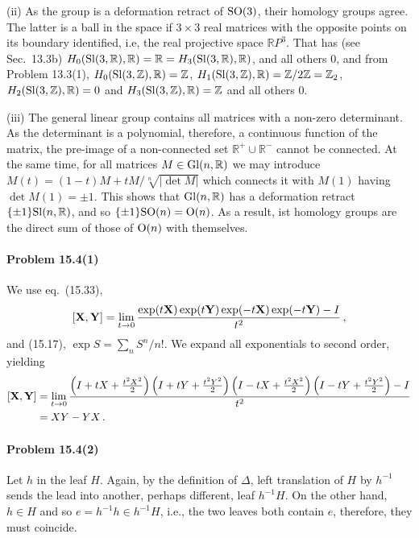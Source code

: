 \documentclass[a4paper,12pt]{article}
\newcommand{\problem}[1]{\paragraph{Problem #1}}
\begin{document}
(ii) As the group is a deformation retract of ${\rm SO}(3)$, their homology groups agree. The latter is a ball in the space if $3\times 3$ real matrices with the opposite points on its boundary identified, i.e, the real projective space $\mathbb{R}P^3$. That has (see Sec.\ 13.3b) $H_0({\rm Sl}(3, \mathbb{R}), \mathbb{R})=\mathbb{R} = H_3({\rm Sl}(3, \mathbb{R}), \mathbb{R})$, and all others 0, and from Problem 13.3(1),  $H_0({\rm Sl}(3, \mathbb{Z}), \mathbb{R})=\mathbb{Z}$, $H_1({\rm Sl}(3, \mathbb{Z}), \mathbb{R})=\mathbb{Z}/2\mathbb{Z}=\mathbb{Z}_2$, $H_2({\rm Sl}(3, \mathbb{Z}), \mathbb{R})=0$ and $H_3({\rm Sl}(3, \mathbb{Z}), \mathbb{R})=\mathbb{Z}$ and all others 0.

(iii) The general linear group contains all matrices with a non-zero determinant. As the determinant is a polynomial, therefore, a continuous function of the matrix, the pre-image of a non-connected set $\mathbb{R}^+ \cup \mathbb{R}^-$ cannot be connected.  At the same time, for all matrices $M\in {\rm Gl}(n, \mathbb{R})$ we may introduce $M(t) = (1-t) M + t M/\sqrt[n]{|\det M|}$ which connects it with $M(1)$ having $\det M(1) = \pm 1$. %
This shows that ${\rm Gl}(n, \mathbb{R})$ has a deformation retract $\{\pm 1\}{\rm Sl}(n, \mathbb{R})$, and so $\{\pm 1\}{\rm SO}(n) = {\rm O}(n)$. As a result, ist homology groups are the direct sum of those of ${\rm O}(n)$ with themselves.


\problem{15.4(1)} We use eq.\ (15.33),
\[
 [{\bf X}, {\bf Y}] = \lim_{t\to 0}\frac{\exp(t{\bf X})\exp(t{\bf Y})\exp(-t{\bf X})\exp(-t{\bf Y})-I}{t^2}\,,
\]
and (15.17), $\exp S = \sum_n S^n/{n!}$. We expand all exponentials to second order, yielding
\[
\begin{aligned}{}
 [{\bf X}, {\bf Y}] &= \lim_{t\to 0}\frac{\left(I+tX+\frac{t^2 X^2}{2}\right) \left(I+tY+\frac{t^2 Y^2}{2}\right) \left(I-tX+\frac{t^2 X^2}{2}\right) \left(I- tY+\frac{t^2 Y^2}{2}\right) - I}{t^2}\\
 &= X Y-Y X\,.
\end{aligned}
\]


\problem{15.4(2)} Let $h$ in the leaf $H$. Again, by the definition of $\Delta$, left translation of $H$ by $h^{-1}$ sends the lead into another, perhaps different, leaf $h^{-1} H$. On the other hand, $h\in H$ and so $e = h^{-1} h \in h^{-1} H$, i.e., the two leaves both contain $e$, therefore, they must coincide.
\end{document}
